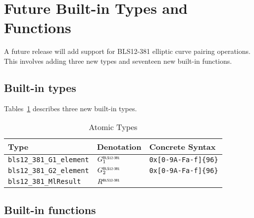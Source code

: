 \renewcommand{\note}[1]{
  \bigskip
  \refstepcounter{notenumberC}
  \noindent\textbf{Note \thenotenumberC. #1}
}

\newpage

\section{Future Built-in Types and Functions}
\label{appendix:default-builtins-future}
A future release will add support for BLS12-381 elliptic curve pairing
operations.  This involves adding three new types and seventeen new built-in
functions.

\subsection{Built-in types}
\label{sec:future-built-in-types}
Tables~\ref{table:future-built-in-types} describes three new built-in
types.

\newcommand{\Gone}{G_1^{\textsf{\tiny{BLS12-381}}}}
\newcommand{\Gtwo}{G_2^{\textsf{\tiny{BLS12-381}}}}
\newcommand{\MlResult}{R^{\textsf{\tiny{BLS12-381}}}}

\begin{table}[H]
  \centering
    \begin{tabular}{|l|p{6cm}|l|}
        \hline
        Type & Denotation & Concrete Syntax\\
        \hline
        \texttt{bls12\_381\_G1\_element} &   $\Gone$ & \texttt{0x[0-9A-Fa-f]\{96\}}\\
        \texttt{bls12\_381\_G2\_element} &   $\Gtwo$ & \texttt{0x[0-9A-Fa-f]\{96\}}\\
        \texttt{bls12\_381\_MlResult}    &   $\MlResult$  &  \\
        \hline
    \end{tabular}
    \caption{Atomic Types}
    \label{table:future-built-in-types}
\end{table}



\subsection{Built-in functions}
\label{sec:future-built-in-functions}

